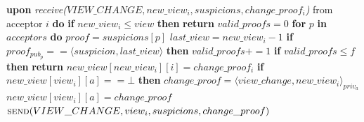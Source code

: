 \begin{algorithm}
\begin{algorithmic}[1]
		\State\textbf{upon} \textit{receive($VIEW\_CHANGE, new\_view_i, suspicions, change\_proof_i$)} from acceptor $i$ \textbf{do} 
		\State\hspace{\algorithmicindent} \textbf{if} $new\_view_i \leq view$ \textbf{then}
		\State\hspace{\algorithmicindent}\hspace{\algorithmicindent}\textbf{return}
		\State
		\State\hspace{\algorithmicindent} $valid\_proofs = 0$
		\State\hspace{\algorithmicindent} \textbf{for} $p$ \textbf{in} $acceptors$ \textbf{do} 
		\State\hspace{\algorithmicindent}\hspace{\algorithmicindent} $proof = suspicions[p]$
		\State\hspace{\algorithmicindent}\hspace{\algorithmicindent} $last\_view = new\_view_i-1$
		\State\hspace{\algorithmicindent}\hspace{\algorithmicindent} \textbf{if} $proof_{pub_p} == \langle suspicion, last\_view \rangle$ \textbf{then}
		\State\hspace{\algorithmicindent}\hspace{\algorithmicindent}\hspace{\algorithmicindent} $valid\_proofs \mathrel{+{=}} 1$
		\State
		\State\hspace{\algorithmicindent} \textbf{if} $valid\_proofs \leq f$ \textbf{then}
		\State\hspace{\algorithmicindent}\hspace{\algorithmicindent} \textbf{return}
		\State
		\State\hspace{\algorithmicindent} $new\_view[new\_view_i][i] = change\_proof_i$
		\State\hspace{\algorithmicindent} \textbf{if} $new\_view[view_i][a] == \bot$ \textbf{then}				
		\State\hspace{\algorithmicindent}\hspace{\algorithmicindent} $change\_proof = \langle view\_change, new\_view_i \rangle_{priv_a}$
		\State\hspace{\algorithmicindent}\hspace{\algorithmicindent} $new\_view[view_i][a] = change\_proof$
		\State\hspace{\algorithmicindent}\hspace{\algorithmicindent}  $\Call{send}{VIEW\_CHANGE, view_i, suspicions, change\_proof}$

\end{algorithmic}
\end{algorithm}
